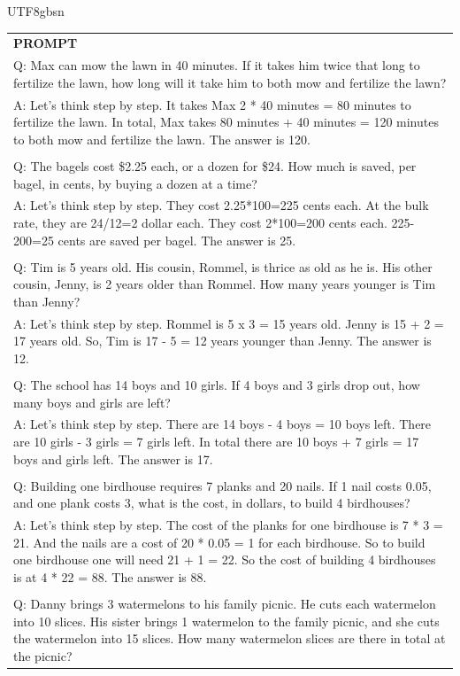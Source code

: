 \documentclass[11pt, a4paper, logo, copyright, nonumbering]{deepseek}
\begin{document}
\begin{CJK*}{UTF8}{gbsn}
\begin{table}[ht]
    \centering \small
\begin{tabular}{p{12cm}}
\toprule
\textbf{PROMPT}\\
Q: Max can mow the lawn in 40 minutes. If it takes him twice that long to fertilize the lawn, how long will it take him to both mow and fertilize the lawn?
\\A: Let's think step by step. It takes Max 2 * 40 minutes = 80 minutes to fertilize the lawn. In total, Max takes 80 minutes + 40 minutes = 120 minutes to both mow and fertilize the lawn. The answer is 120.
\\
\\Q: The bagels cost \$2.25 each, or a dozen for \$24. How much is saved, per bagel, in cents, by buying a dozen at a time?
\\A: Let's think step by step. They cost 2.25*100=225 cents each. At the bulk rate, they are 24/12=2 dollar each. They cost 2*100=200 cents each. 225-200=25 cents are saved per bagel. The answer is 25.
\\
\\Q: Tim is 5 years old. His cousin, Rommel, is thrice as old as he is. His other cousin, Jenny, is 2 years older than Rommel. How many years younger is Tim than Jenny?
\\A: Let's think step by step. Rommel is 5 x 3 = 15 years old. Jenny is 15 + 2 = 17 years old. So, Tim is 17 - 5 = 12 years younger than Jenny. The answer is 12.
\\
\\Q: The school has 14 boys and 10 girls. If 4 boys and 3 girls drop out, how many boys and girls are left?
\\A: Let's think step by step. There are 14 boys - 4 boys = 10 boys left. There are 10 girls - 3 girls = 7 girls left. In total there are 10 boys + 7 girls = 17 boys and girls left. The answer is 17.
\\
\\Q: Building one birdhouse requires 7 planks and 20 nails. If 1 nail costs 0.05, and one plank costs 3, what is the cost, in dollars, to build 4 birdhouses?
\\A: Let's think step by step. The cost of the planks for one birdhouse is 7 * 3 = 21. And the nails are a cost of 20 * 0.05 = 1 for each birdhouse. So to build one birdhouse one will need 21 + 1 = 22. So the cost of building 4 birdhouses is at 4 * 22 = 88. The answer is 88.
\\
\\Q: Danny brings 3 watermelons to his family picnic. He cuts each watermelon into 10 slices. His sister brings 1 watermelon to the family picnic, and she cuts the watermelon into 15 slices. How many watermelon slices are there in total at the picnic?

\end{tabular}
\end{table}
\end{CJK*}
\end{document}
